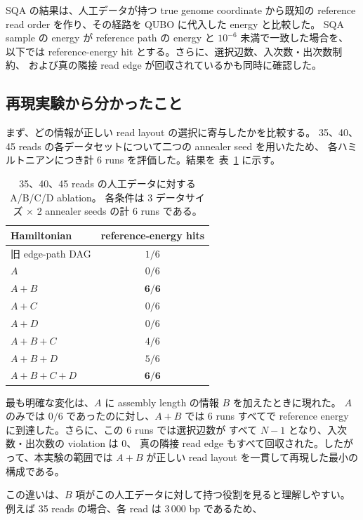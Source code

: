 \documentclass[a4j,10pt]{ujarticle}
\begin{document}
SQA の結果は、人工データが持つ true genome coordinate から既知の
reference read order を作り、その経路を QUBO に代入した energy と比較した。
SQA sample の energy が reference path の energy と $10^{-6}$ 未満で一致した場合を、
以下では reference-energy hit とする。さらに、選択辺数、入次数・出次数制約、
および真の隣接 read edge が回収されているかも同時に確認した。


\subsection{再現実験から分かったこと}

まず、どの情報が正しい read layout の選択に寄与したかを比較する。
35、40、45 reads の各データセットについて二つの annealer seed を用いたため、
各ハミルトニアンにつき計 6 runs を評価した。結果を
表~\ref{tab:abcd_ablation} に示す。

\begin{table}[t]
\centering
\caption{35、40、45 reads の人工データに対する A/B/C/D ablation。
各条件は 3 データサイズ $\times$ 2 annealer seeds の計 6 runs である。}
\label{tab:abcd_ablation}
\begin{tabular}{lc}
\hline
Hamiltonian & reference-energy hits \\
\hline
旧 edge-path DAG & $1/6$ \\
$A$ & $0/6$ \\
$A+B$ & $\mathbf{6/6}$ \\
$A+C$ & $0/6$ \\
$A+D$ & $0/6$ \\
$A+B+C$ & $4/6$ \\
$A+B+D$ & $5/6$ \\
$A+B+C+D$ & $\mathbf{6/6}$ \\
\hline
\end{tabular}
\end{table}

最も明確な変化は、$A$ に assembly length の情報 $B$ を加えたときに現れた。
$A$ のみでは $0/6$ であったのに対し、$A+B$ では 6 runs すべてで
reference energy に到達した。さらに、この 6 runs では選択辺数が
すべて $N-1$ となり、入次数・出次数の violation は 0、
真の隣接 read edge もすべて回収された。したがって、本実験の範囲では
$A+B$ が正しい read layout を一貫して再現した最小の構成である。

この違いは、$B$ 項がこの人工データに対して持つ役割を見ると理解しやすい。
例えば 35 reads の場合、各 read は $3\,000$ bp であるため、
\end{document}
